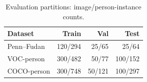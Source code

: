 \begin{table}[t]
\centering
\caption{Evaluation partitions: image/person-instance counts.}
\label{tab:public_splits}
\setlength{\tabcolsep}{4pt}
\begin{tabular}{lrrr}
\toprule
Dataset & Train & Val & Test\\
\midrule
Penn--Fudan & 120/294 & 25/65 & 25/64\\
VOC-person & 300/482 & 50/77 & 100/152\\
COCO-person & 300/748 & 50/121 & 100/297\\
\bottomrule
\end{tabular}
\end{table}
